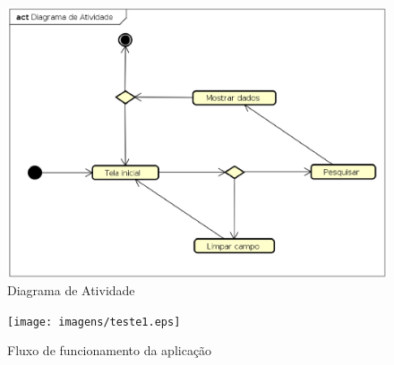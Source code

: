 \begin{figure}[!htb]
        \caption{\label{diagrama1}Diagrama de Atividade}
        \begin{center}
                \includegraphics[width=\textwidth]{imagens/teste.eps}
        \end{center}
\end{figure}


\begin{figure}[!htb]
        \caption{\label{diagrama1}Fluxo de funcionamento da aplicação}
        \begin{center}
                \texttt{[image: imagens/teste1.eps]}
        \end{center}
\end{figure}
